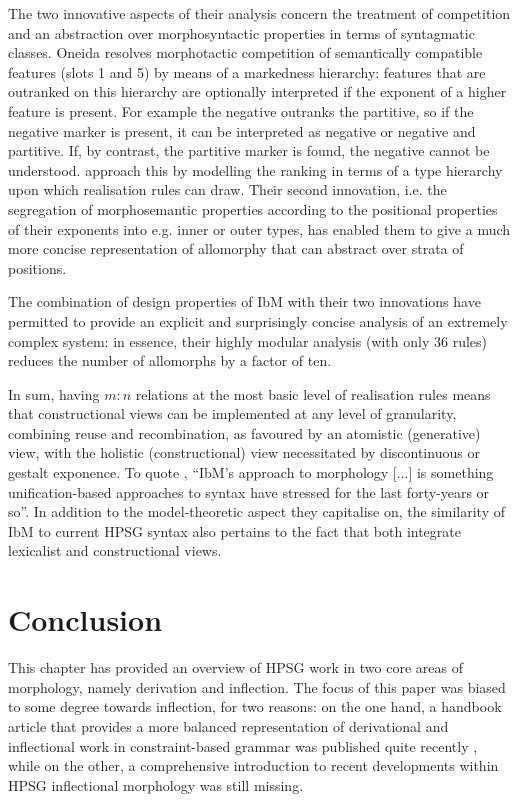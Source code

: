 \documentclass[output=paper
	        ,collection
	        ,collectionchapter
 	        ,biblatex
                ,babelshorthands
                ,newtxmath
                ,draftmode
                ,colorlinks, citecolor=brown
]{langscibook}
\begin{document}
\begin{exe}
\begin{xlist}
\begin{exe}
\begin{xlist}
The two innovative aspects of their analysis concern the treatment of
competition and an abstraction over morphosyntactic properties in
terms of syntagmatic classes. Oneida resolves morphotactic competition
of semantically compatible features (slots 1 and 5) by means of a
markedness hierarchy: features that are outranked on this hierarchy
are optionally interpreted if the exponent of a higher feature is
present. For example the negative outranks the partitive, so if the negative
marker is present, it can be interpreted as negative or negative and
partitive. If, by contrast, the partitive marker is found, the
negative cannot be understood.  \citet{diaz:koenig:michelson:19}
approach this by modelling the ranking in terms of a type hierarchy
upon which realisation rules can draw. Their second innovation, i.e. 
the  segregation of morphosemantic properties according to
the positional properties of their exponents into e.g. inner or outer
types, has enabled them to give a much more concise representation of
allomorphy that can abstract over strata of positions. 

The combination of design properties of IbM with their two innovations
have permitted \citet{diaz:koenig:michelson:19} to provide an explicit
and surprisingly concise analysis of an extremely complex system: in
essence, their highly modular analysis (with only 36 rules) reduces the
number of allomorphs by a factor of ten.

\bigskip\noindent In sum, having $m:n$ relations at the most basic
level of realisation rules means that constructional views can be
implemented at any level of granularity, combining reuse and
recombination, as favoured by an atomistic (generative) view, with the
holistic (constructional) view necessitated by discontinuous or
gestalt exponence.  To quote \citet{diaz:koenig:michelson:19}, ``IbM’s
approach to morphology [...] is something unification-based approaches
to syntax have stressed for the last forty-years or so''. In addition
to the model-theoretic aspect they capitalise on, the similarity of
IbM to current HPSG syntax also pertains to the fact that both integrate
lexicalist and constructional views.

\section{Conclusion}

This chapter has provided an overview of HPSG work in two core areas
of morphology, namely derivation and inflection. The focus of this
paper was biased to some degree towards inflection, for two reasons:
on the one hand, a handbook article that provides a more balanced
representation of derivational and inflectional work in
constraint-based grammar was published quite recently
\citep{Bonami15b}, while on the other, a comprehensive introduction
to recent developments within HPSG inflectional morphology was still
missing.


\end{xlist}
\end{exe}
\end{xlist}
\end{exe}
\end{document}
